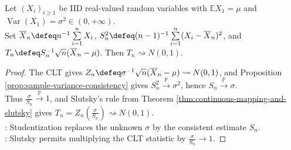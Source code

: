 \begin{theorem} \label{thm:studentized-central-limit-theorem} \\
Let $(X_i)_{i\geq1}$ be IID real-valued random variables with $\mathbb{E}X_1=\mu$ and $\operatorname{Var}(X_1)=\sigma^2\in(0,+\infty)$.\\
Set $\overline{X}_n\defeq n^{-1}\sum\limits_{i=1}^{n}X_i$, $S_n^2\defeq(n-1)^{-1}\sum\limits_{i=1}^{n}(X_i-\overline{X}_n)^2$, and $T_n\defeq S_n^{-1}\sqrt{n}(\overline{X}_n-\mu)$.
Then $T_n\rightsquigarrow N(0,1)$.
\begin{proof}
The CLT gives $Z_n\defeq\sigma^{-1}\sqrt{n}(\overline{X}_n-\mu)\rightsquigarrow N(0,1)$, and Proposition \ref{prop:sample-variance-consistency} gives $S_n^2\xrightarrow{\mathbb{P}}\sigma^2$, hence $S_n\xrightarrow{\mathbb{P}}\sigma$.\\
Thus $\frac{\sigma}{S_n}\xrightarrow{\mathbb{P}}1$, and Slutsky's rule from Theorem \ref{thm:continuous-mapping-and-slutsky} gives $T_n=Z_n(\frac{\sigma}{S_n})\rightsquigarrow N(0,1)$.\\
: Studentization replaces the unknown $\sigma$ by the consistent estimate $S_n$.\\
: Slutsky permits multiplying the CLT statistic by $\frac{\sigma}{S_n}\to1$.
\end{proof}
\end{theorem}

